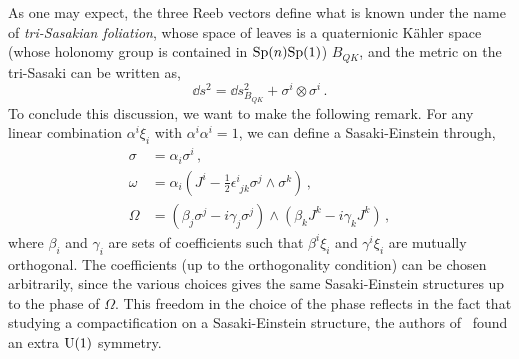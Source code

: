 \documentclass[debug]{phd}
\begin{document}
					As one may expect, the three Reeb vectors define what is known under the name of \emph{tri-Sasakian foliation}, whose space of leaves is a quaternionic K\"ahler space (whose holonomy group is contained in $\mathrm{Sp}(n)\mathrm{Sp}(1)$) $B_{QK}$, and the metric on the tri-Sasaki can be written as,
							\begin{equation}
								\dd s^2 = \dd s^2_{B_{QK}} + \sigma^i \otimes \sigma ^i \, .
							\end{equation}
					To conclude this discussion, we want to make the following remark.
					For any linear combination $\alpha^i \xi_i$ with $\alpha^i \alpha^i =1$, we can define a Sasaki-Einstein through,
							\begin{align*}
								\sigma &= \alpha_i \sigma^i \, , \\
								\omega &= \alpha_i \left(J^i - \frac{1}{2} \epsilon^i_{\phantom{i}jk} \sigma^j \wedge \sigma^k \right) \, , \\
								\Omega &=  \left(\beta_j \sigma^j - i \gamma_j \sigma^j  \right) \wedge \left(\beta_k J^k - i \gamma_k J^k  \right)\, ,
							\end{align*}
					where $\beta_i$ and $\gamma_i$ are sets of coefficients such that $\beta^i \xi_i$ and $\gamma^i \xi_i$ are mutually orthogonal.
					The coefficients (up to the orthogonality condition) can be chosen arbitrarily, since the various choices gives the same Sasaki-Einstein structures up to the phase of $\Omega$.
					This freedom in the choice of the phase reflects in the fact that studying a compactification on a Sasaki-Einstein structure, the authors of~\cite{Gauntlett:2009zw} found an extra $\mathrm{U}(1)$ symmetry.
\end{document}
